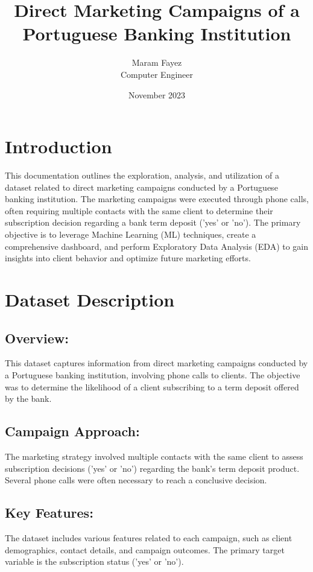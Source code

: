 \documentclass{article}
\title{Direct Marketing Campaigns of a Portuguese Banking Institution}
\author{Maram Fayez \\ Computer Engineer }
\date{November 2023}
\begin{document}
\maketitle

\section{ Introduction}
This documentation outlines the exploration, analysis, and utilization of a dataset related to direct marketing campaigns conducted by a Portuguese banking institution. The marketing campaigns were executed through phone calls, often requiring multiple contacts with the same client to determine their subscription decision regarding a bank term deposit ('yes' or 'no'). The primary objective is to leverage Machine Learning (ML) techniques, create a comprehensive dashboard, and perform Exploratory Data Analysis (EDA) to gain insights into client behavior and optimize future marketing efforts.

\section{Dataset Description}
\subsection{Overview:}
This dataset captures information from direct marketing campaigns conducted by a Portuguese banking institution, involving phone calls to clients. The objective was to determine the likelihood of a client subscribing to a term deposit offered by the bank.

\subsection{Campaign Approach:}
The marketing strategy involved multiple contacts with the same client to assess subscription decisions ('yes' or 'no') regarding the bank's term deposit product. Several phone calls were often necessary to reach a conclusive decision.

\subsection{Key Features:}
The dataset includes various features related to each campaign, such as client demographics, contact details, and campaign outcomes. The primary target variable is the subscription status ('yes' or 'no').
\end{document}
